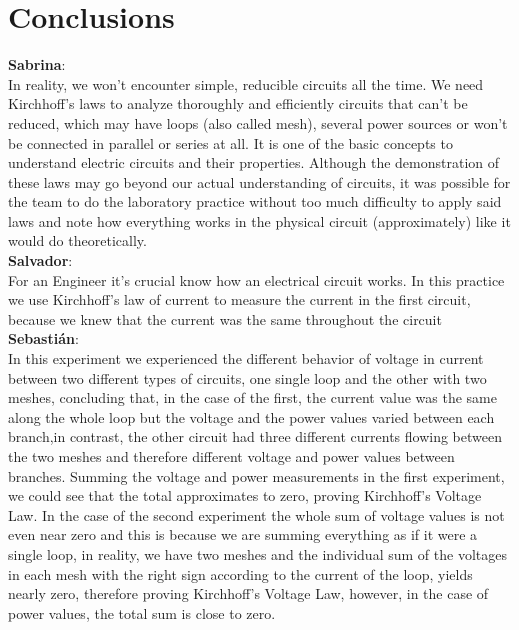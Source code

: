 \documentclass[a4paper]{article}
\begin{document}
\section{Conclusions}
\justify
{\large\textbf{Sabrina}:}\\[0.5ex]
In reality, we won’t encounter simple, reducible circuits all the time. We need Kirchhoff’s laws to analyze thoroughly and efficiently circuits that can't be reduced, which may have loops (also called mesh), several power sources or won't be connected in parallel or series at all. It is one of the basic concepts to understand electric circuits and their properties. Although the demonstration of these laws may go beyond our actual understanding of circuits, it was possible for the team to do the laboratory practice without too much difficulty to apply said laws and note how everything works in the physical circuit (approximately) like it would do theoretically.\\[2ex]
{\large\textbf{Salvador}:}\\[0.5ex]
For an Engineer it’s crucial know how an electrical circuit works. In this practice we use Kirchhoff’s law of current to measure the current in the first circuit, because we knew that the current was the same throughout the circuit\\[2ex]
{\large\textbf{Sebastián}:}\\[0.5ex]
In this experiment we experienced the different behavior of voltage in current between two different types of circuits, one  single loop and the other with two meshes, concluding that, in the case of the first, the current value was the same along the whole loop but the voltage and the power values varied between each branch,in contrast, the other circuit had three different currents flowing between the two meshes and therefore different voltage and power values between branches. Summing the voltage and power measurements in the first experiment, we could see that the total approximates to zero, proving Kirchhoff's Voltage Law. In the case of the second experiment the whole sum of voltage values is not even near zero and this is because we are summing everything as if it were a single loop, in reality, we have two meshes and the individual sum of the voltages in each mesh with the right sign according to the current of the loop, yields nearly zero, therefore proving Kirchhoff's Voltage Law, however, in the case of power values, the total sum is close to zero.
\\[2ex]
\end{document}
